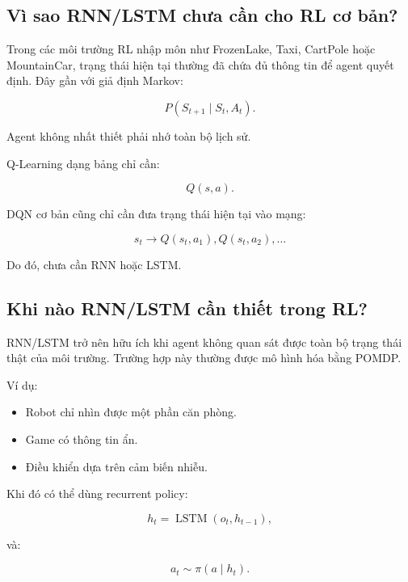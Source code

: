 \documentclass[12pt,a4paper]{report}
\begin{document}
\subsection{Vì sao RNN/LSTM chưa cần cho RL cơ bản?}

Trong các môi trường RL nhập môn như FrozenLake, Taxi, CartPole hoặc MountainCar, trạng thái hiện tại thường đã chứa đủ thông tin để agent quyết định. Đây gần với giả định Markov:

\begin{equation}
P(S_{t+1}\mid S_t,A_t).
\end{equation}

Agent không nhất thiết phải nhớ toàn bộ lịch sử.

Q-Learning dạng bảng chỉ cần:

\begin{equation}
Q(s,a).
\end{equation}

DQN cơ bản cũng chỉ cần đưa trạng thái hiện tại vào mạng:

\begin{equation}
s_t
\rightarrow
Q(s_t,a_1),Q(s_t,a_2),\ldots
\end{equation}

Do đó, chưa cần RNN hoặc LSTM.

\subsection{Khi nào RNN/LSTM cần thiết trong RL?}

RNN/LSTM trở nên hữu ích khi agent không quan sát được toàn bộ trạng thái thật của môi trường. Trường hợp này thường được mô hình hóa bằng POMDP.

Ví dụ:

\begin{itemize}[leftmargin=1.5em]
    \item Robot chỉ nhìn được một phần căn phòng.
    \item Game có thông tin ẩn.
    \item Điều khiển dựa trên cảm biến nhiễu.
\end{itemize}

Khi đó có thể dùng recurrent policy:

\begin{equation}
h_t
=
\operatorname{LSTM}(o_t,h_{t-1}),
\end{equation}

và:

\begin{equation}
a_t \sim \pi(a\mid h_t).
\end{equation}
\end{document}

